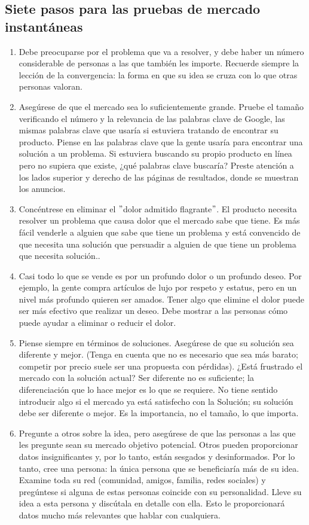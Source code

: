 \documentclass[10pt]{book}
\begin{document}
	    \subsection{Siete pasos para las pruebas de mercado instantáneas}
		\begin{enumerate}[\bfseries 1.]
			\item Debe preocuparse por el problema que va a resolver, y debe haber un número considerable de personas a las que también les importe. Recuerde siempre la lección de la convergencia: la forma en que su idea se cruza con lo que otras personas valoran.
			\item Asegúrese de que el mercado sea lo suficientemente grande. Pruebe el tamaño verificando el número y la relevancia de las palabras clave de Google, las mismas palabras clave que usaría si estuviera tratando de encontrar su producto. Piense en las palabras clave que la gente usaría para encontrar una solución a un problema. Si estuviera buscando su propio producto en línea pero no supiera que existe, ¿qué palabras clave buscaría? Preste atención a los lados superior y derecho de las páginas de resultados, donde se muestran los anuncios.
			\item Concéntrese en eliminar el $"$dolor admitido flagrante$"$. El producto necesita resolver un problema que causa dolor que el mercado sabe que tiene. Es más fácil venderle a alguien que sabe que tiene un problema y está convencido de que necesita una solución que persuadir a alguien de que tiene un problema que necesita solución..
			\item Casi todo lo que se vende es por un profundo dolor o un profundo deseo.  Por ejemplo, la gente compra artículos de lujo por respeto y estatus, pero en un nivel más profundo quieren ser amados. Tener algo que elimine el dolor puede ser más efectivo que realizar un deseo. Debe mostrar a las personas cómo puede ayudar a eliminar o reducir el dolor.
			\item Piense siempre en términos de soluciones. Asegúrese de que su solución sea diferente y mejor. (Tenga en cuenta que no es necesario que sea más barato; competir por precio suele ser una propuesta con pérdidas). ¿Está frustrado el mercado con la solución actual? Ser diferente no es suficiente; la diferenciación que lo hace mejor es lo que se requiere. No tiene sentido introducir algo si el mercado ya está satisfecho con la Solución; su solución debe ser diferente o mejor. Es la importancia, no el tamaño, lo que importa.
			\item Pregunte a otros sobre la idea, pero asegúrese de que las personas a las que les pregunte sean su mercado objetivo potencial. Otros pueden proporcionar datos insignificantes y, por lo tanto, están sesgados y desinformados. Por lo tanto, cree una persona: la única persona que se beneficiaría más de su idea. Examine toda su red (comunidad, amigos, familia, redes sociales) y pregúntese si alguna de estas personas coincide con su personalidad. Lleve su idea a esta persona y discútala en detalle con ella. Esto le proporcionará datos mucho más relevantes que hablar con cualquiera.

\end{enumerate}
\end{document}
